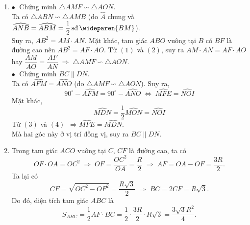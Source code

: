 \begin{ex}
{\begin{enumerate}
			$\widehat{BEN}=\widehat{MEC}$ (đối đỉnh)\\
			$\widehat{BNE}=\widehat{MCE}$ (cùng chắn cung $\wideparen{BM}$)\\
			Suy ra, $\triangle{EBN} \backsim \triangle{EMC}$, suy ra $\dfrac{EB}{EM}=\dfrac{EN}{EC}$ hay $EB\cdot EC=EM\cdot EN$.\\
			$\bullet\;$ Chứng minh $IA$ là tia phân giác của $\widehat{BIC}$.\\
			Ta có $OI \perp MN$ (định lý đường kính và dây cung)\\
			Suy ra, $I$ thuộc đường tròn đường kính $AO$ hay $5$ điểm $O,I,B,A,C$ cùng thuộc một đường tròn.\\
			Ta có $\widehat{AIB}=\widehat{ACB}$ (cùng chắn cung $\wideparen{AB}$)\\
			và $\widehat{AIC}=\widehat{ABC}$ (cùng chắn cung $\wideparen{AC}$)\\
			mà $\widehat{ACB}=\widehat{ABC}$ (tính chất hai tiếp tuyến cắt nhau)\\
			Suy ra, $\widehat{AIB}=\widehat{AIC}$ hay $IA$ tia phân giác của $\widehat{BIC}$.
		\item $\bullet\;$ Chứng minh $\triangle{AMF} \backsim \triangle{AON}$.\\
		Ta có $\triangle{ABN} \backsim \triangle{AMB}$ (do $\widehat{A}$ chung và $\widehat{ANB}=\widehat{ABM}=\dfrac{1}{2}\text{\,sđ\,}\wideparen{BM}$).\\
		Suy ra, $AB^2=AM\cdot AN$. 
		Mặt khác, tam giác $ABO$ vuông tại $B$ có $BF$ là đường cao nên $AB^2=AF \cdot AO$.	
		Từ $(1)$ và $(2)$, suy ra $AM\cdot AN=AF \cdot AO$ hay $\dfrac{AM}{AO}=\dfrac{AF}{AN} \;\Rightarrow\; \triangle{AMF} \backsim \triangle{AON}$.\\
		$\bullet\;$ Chứng minh $BC \parallel DN$.\\
		Ta có $\widehat{AFM}=\widehat{ANO}$ (do $\triangle{AMF} \backsim \triangle{AON}$).
		Suy ra,
		\[90^\circ - \widehat{AFM}= 90^\circ - \widehat{ANO} \;\Leftrightarrow\; \widehat{MFE}=\widehat{NOI} \tag{3}\]
		Mặt khác,
		\[\widehat{MDN}=\dfrac{1}{2}\widehat{MON}=\widehat{NOI} \tag{4}\]
		Từ $(3)$ và $(4)$ $\,\Rightarrow \widehat{MFE}=\widehat{MDN}$.\\
		Mà hai góc này ở vị trí đồng vị, suy ra $BC \parallel DN$.
		\item Trong tam giác $ACO$ vuông tại $C$, $CF$ là đường cao, ta có
		\[OF\cdot OA = OC^2 \;\Rightarrow\; OF=\dfrac{OC^2}{OA}=\dfrac{R}{2}
		\;\Rightarrow\; AF=OA-OF=\dfrac{3R}{2}.\]
		Ta lại có
		\[CF=\sqrt{OC^2-OF^2}=\dfrac{R\sqrt{3}}{2} \;\Rightarrow\; BC=2CF=R\sqrt{3}.\]
		Do đó, diện tích tam giác $ABC$ là
		\[S_{ABC}=\dfrac{1}{2}AF\cdot BC=\dfrac{1}{2}\cdot \dfrac{3R}{2}\cdot R\sqrt{3}=\dfrac{3\sqrt{3}R^2}{4}.\]
	\end{enumerate}
	}
\end{ex}
